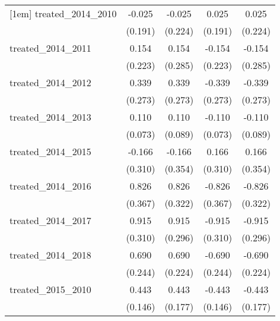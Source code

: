 {\begin{tabular}{l*{4}{c}}
[1em]
treated\_2014\_2010&      -0.025         &      -0.025         &       0.025         &       0.025         \\
            &     (0.191)         &     (0.224)         &     (0.191)         &     (0.224)         \\
[1em]
treated\_2014\_2011&       0.154         &       0.154         &      -0.154         &      -0.154         \\
            &     (0.223)         &     (0.285)         &     (0.223)         &     (0.285)         \\
[1em]
treated\_2014\_2012&       0.339         &       0.339         &      -0.339         &      -0.339         \\
            &     (0.273)         &     (0.273)         &     (0.273)         &     (0.273)         \\
[1em]
treated\_2014\_2013&       0.110         &       0.110         &      -0.110         &      -0.110         \\
            &     (0.073)         &     (0.089)         &     (0.073)         &     (0.089)         \\
[1em]
treated\_2014\_2015&      -0.166         &      -0.166         &       0.166         &       0.166         \\
            &     (0.310)         &     (0.354)         &     (0.310)         &     (0.354)         \\
[1em]
treated\_2014\_2016&       0.826\sym{*}  &       0.826\sym{*}  &      -0.826\sym{*}  &      -0.826\sym{*}  \\
            &     (0.367)         &     (0.322)         &     (0.367)         &     (0.322)         \\
[1em]
treated\_2014\_2017&       0.915\sym{**} &       0.915\sym{**} &      -0.915\sym{**} &      -0.915\sym{**} \\
            &     (0.310)         &     (0.296)         &     (0.310)         &     (0.296)         \\
[1em]
treated\_2014\_2018&       0.690\sym{**} &       0.690\sym{**} &      -0.690\sym{**} &      -0.690\sym{**} \\
            &     (0.244)         &     (0.224)         &     (0.244)         &     (0.224)         \\
[1em]
treated\_2015\_2010&       0.443\sym{**} &       0.443\sym{*}  &      -0.443\sym{**} &      -0.443\sym{*}  \\
            &     (0.146)         &     (0.177)         &     (0.146)         &     (0.177)         \\

\end{tabular}}

